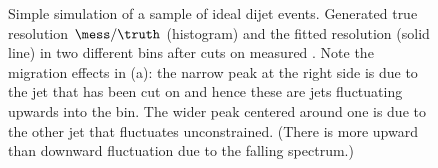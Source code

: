 \documentclass[a4paper]{cmspaper} %
\begin{document}
\begin{figure}[ht]
  \begin{center}
     
  \end{center}
  \caption{Simple simulation of a sample of ideal dijet
    events. Generated true resolution \mbox{$\mess / \truth$} (histogram) and the fitted
    resolution (solid line) in two different \truth bins after cuts on measured \pt.
    Note the migration effects in (a): the narrow peak at the right side is due to the jet that has been cut on and hence these are jets fluctuating upwards into the \pt bin.
    The wider peak centered around one is due to the other jet that fluctuates unconstrained.
    (There is more upward than downward fluctuation due to the falling spectrum.)
  }
  \label{fig:resFit:toyMC:ptCuts:reso}
\end{figure}
\end{document}
